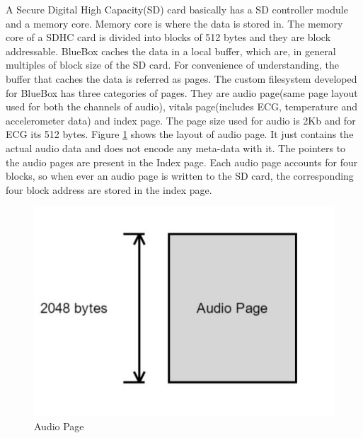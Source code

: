 A Secure Digital High Capacity(SD) card basically has a SD controller module and a memory core. Memory core is where the data is stored in. The memory core of a SDHC card is divided into blocks of 512 bytes and they are block addressable. BlueBox caches the data in a local buffer, which are, in general multiples of block size of the SD card. For convenience of understanding, the buffer that caches the data is referred as pages. The custom filesystem developed for BlueBox has three categories of pages. They are audio page(same page layout used for both the channels of audio), vitals page(includes ECG, temperature and accelerometer data) and index page. The page size used for audio is 2Kb and for ECG its 512 bytes.
 Figure \ref{audio_page} shows the layout of audio page. It just contains the actual audio data and does not encode any meta-data with it. The pointers to the audio pages are present in the Index page. Each audio page accounts for four blocks, so when ever an audio page is written to the SD card, the corresponding four block address are stored in the index page. 
\begin{figure}[h]
	\centering
	\hspace*{-2cm} 
	\includegraphics[scale = 0.5 ]{audio_page.JPG}
	\caption{Audio Page\label{audio_page}}
\end{figure}

